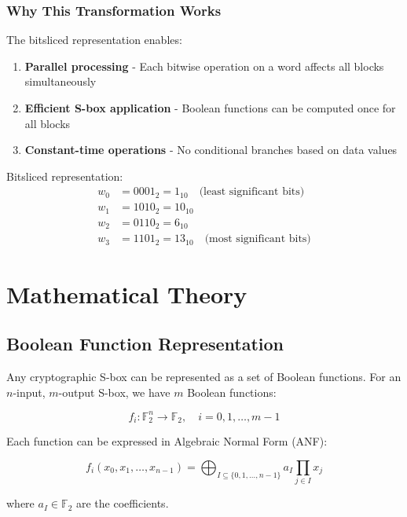 \documentclass[11pt,a4paper]{article}
\begin{document}
\subsubsection{Why This Transformation Works}

The bitsliced representation enables:
\begin{enumerate}
    \item \textbf{Parallel processing} - Each bitwise operation on a word affects all blocks simultaneously
    \item \textbf{Efficient S-box application} - Boolean functions can be computed once for all blocks
    \item \textbf{Constant-time operations} - No conditional branches based on data values
\end{enumerate}

Bitsliced representation:
\begin{align}
w_0 &= 0001_2 = 1_{10} \quad \text{(least significant bits)} \\
w_1 &= 1010_2 = 10_{10} \\
w_2 &= 0110_2 = 6_{10} \\
w_3 &= 1101_2 = 13_{10} \quad \text{(most significant bits)}
\end{align}

\section{Mathematical Theory}

\subsection{Boolean Function Representation}

Any cryptographic S-box can be represented as a set of Boolean functions. For an $n$-input, $m$-output S-box, we have $m$ Boolean functions:

\begin{equation}
f_i: \mathbb{F}_2^n \rightarrow \mathbb{F}_2, \quad i = 0, 1, \ldots, m-1
\end{equation}

Each function can be expressed in Algebraic Normal Form (ANF):

\begin{equation}
f_i(x_0, x_1, \ldots, x_{n-1}) = \bigoplus_{I \subseteq \{0,1,\ldots,n-1\}} a_I \prod_{j \in I} x_j
\end{equation}

where $a_I \in \mathbb{F}_2$ are the coefficients.
\end{document}
